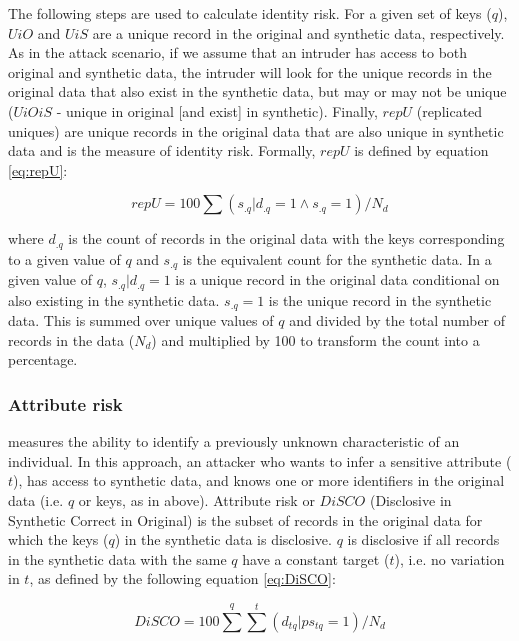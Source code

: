 \documentclass[runningheads]{llncs}
\begin{document}
The following steps are used to calculate identity risk.  For a given set of keys ($q$), $UiO$ and $UiS$ are a unique record in the original and synthetic data, respectively.  As in the attack scenario, if we assume that an intruder has access to both original and synthetic data, the intruder will look for the unique records in the original data that also exist in the synthetic data, but may or may not be unique ($UiOiS$ - unique in original [and exist] in synthetic).  Finally, $repU$ (replicated uniques) are unique records in the original data that are also unique in synthetic data and is the measure of identity risk.  Formally, $repU$ is defined by equation \ref{eq:repU}:

\begin{equation}
repU = 100 \sum (s_{.q}|d_{.q} = 1 \land s_{.q} = 1 )/N_{d}
\label{eq:repU}
\end{equation}

where $d_{.q}$ is the count of records in the original data with the keys corresponding to a given value of $q$ and $s_{.q}$ is the equivalent count for the synthetic data.  In a given value of $q$, $s_{.q}|d_{.q} = 1$ is a unique record in the original data conditional on also existing in the synthetic data.  $s_{.q} = 1$ is the unique record in the synthetic data.  This is summed over unique values of $q$ and divided by the total number of records in the data ($N_{d}$) and multiplied by 100 to transform the count into a percentage.

\subsubsection{Attribute risk} measures the ability to identify a previously unknown characteristic of an individual.  In this approach, an attacker who wants to infer a sensitive attribute ($t$), has access to synthetic data, and knows one or more identifiers in the original data (i.e. $q$ or keys, as in above).  Attribute risk or $DiSCO$ (Disclosive in Synthetic Correct in Original) is the subset of records in the original data for which the keys ($q$) in the synthetic data is disclosive. $q$ is disclosive if all records in the synthetic data with the same $q$ have a constant target ($t$), i.e. no variation in $t$, as defined by the following equation \ref{eq:DiSCO}:

\begin{equation}
DiSCO = 100 \sum^{q} \sum^{t} (d_{tq} | ps_{tq} = 1) / N_{d}
\label{eq:DiSCO}
\end{equation}
\end{document}
